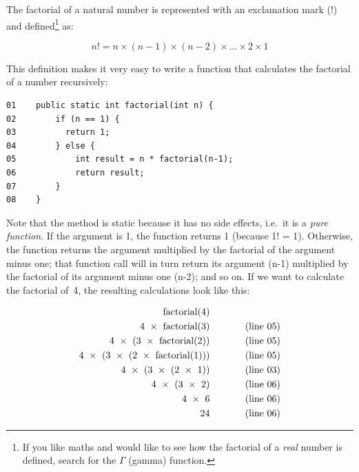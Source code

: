 The factorial of a natural number is represented with an exclamation
mark (!) and defined\footnote{If you like maths and would like to see
  how the factorial of a \emph{real} number is defined, search for the
  $\Gamma$ (gamma) function.} as:  

$$ n! = n \times (n - 1) \times (n - 2) \times \ldots \times 2 \times 1 $$

This definition makes it very easy to write a function that calculates
the factorial of a number recursively: 

\begin{verbatim}
01    public static int factorial(int n) {
02        if (n == 1) {
03          return 1; 
04        } else {
05            int result = n * factorial(n-1);
06            return result;
07        }
08    }
\end{verbatim}

Note that the method is static because it has no side effects,
i.e.~it is a \emph{pure function}. 
If the argument is 1, the function returns 1 (because 1! =
1). Otherwise, the function returns the argument multiplied by the
factorial of the argument minus one; that function call will in turn
return its argument (n-1) multiplied by the factorial of its argument
minus one (n-2); and so on. If we want to calculate the factorial
of~4, the resulting calculations look like this: 

\begin{equation*}
 \begin{aligned}
  \textrm{factorial(4)} & ~~~~~~~~~~~ \verb++\\
  \textrm{4 } \times \textrm{ factorial(3)} & ~~~~~~~~~~~ \textrm{(line 05)} \\
  \textrm{4 } \times \textrm{ (3 } \times \textrm{ factorial(2))} &  ~~~~~~~~~~~ \textrm{(line 05)} \\
  \textrm{4 } \times \textrm{ (3 } \times \textrm{ (2 } \times  \textrm{ factorial(1)))} & ~~~~~~~~~~~ \textrm{(line 05)}\\
  \textrm{4 } \times \textrm{ (3 } \times \textrm{ (2 } \times  \textrm{ 1))} & ~~~~~~~~~~~ \textrm{(line 03)}\\
  \textrm{4 } \times \textrm{ (3 } \times \textrm{ 2)} & ~~~~~~~~~~~ \textrm{(line 06)} \\
  \textrm{4 } \times \textrm{ 6} & ~~~~~~~~~~~ \textrm{(line 06)}\\
  \textrm{24} & ~~~~~~~~~~~ \textrm{(line 06)}\\
 \end{aligned}
\end{equation*}


